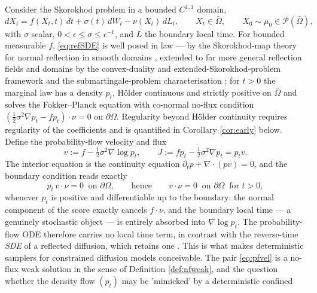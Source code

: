 \documentclass[11pt]{amsart}
\theoremstyle{definition}
\newcommand{\dive}{\nabla\!\cdot}
\newcommand{\PP}{\mathcal{P}}
\newcommand{\dd}{\,d}
\begin{document}
Consider the Skorokhod problem in a bounded $C^{1,1}$ domain,
\begin{equation}\label{eq:refSDE}
dX_t=f(X_t,t)\dd t+\sigma(t)\dd W_t-\nu(X_t)\dd L_t,\qquad
X_t\in\bar\Omega,\qquad X_0\sim\mu_0\in\PP(\bar\Omega),
\end{equation}
with $\sigma$ scalar, $0<\epsilon\le\sigma\le\epsilon^{-1}$, and $L$
the boundary local time. For bounded measurable $f$,
\eqref{eq:refSDE} is well posed in law --- by the Skorokhod-map
theory for normal reflection in smooth domains \cite{LionsSznitman},
extended to far more general reflection fields and domains by the
convex-duality and extended-Skorokhod-problem framework
\cite{DupuisRamanan,RamananESP} and the submartingale-problem
characterisation \cite{KangRamananSub}; 
for $t>0$ the marginal law
has a density $p_t$, H\"older continuous and strictly positive on
$\bar\Omega$ %
and solves the Fokker--Planck equation with co-normal
no-flux condition
$(\tfrac12\sigma^2\nabla p_t-fp_t)\cdot\nu=0$ on $\partial\Omega$.
Regularity beyond H\"older continuity requires regularity of the
coefficients and is quantified in Corollary \ref{cor:early} below.
Define the probability-flow velocity and flux
\begin{equation}\label{eq:pfvel}
v:=f-\tfrac12\sigma^2\nabla\log p_t,\qquad
J:=fp_t-\tfrac12\sigma^2\nabla p_t=p_tv .
\end{equation}
The interior equation is the continuity equation
$\partial_tp+\dive(pv)=0$, and the boundary condition reads exactly
\begin{equation}\label{eq:tangencyref}
p_t\,v\cdot\nu=0\ \text{ on }\partial\Omega,
\qquad\text{hence}\qquad
v\cdot\nu=0\ \text{ on }\partial\Omega\ \text{ for }t>0,
\end{equation}
whenever $p_t$ is positive and differentiable up to the boundary:
the normal component of
the score exactly cancels $f\cdot\nu$, and the boundary local time
--- a genuinely stochastic object --- is entirely absorbed into
$\nabla\log p_t$. The probability-flow ODE therefore carries no
local time term, in contrast with the reverse-time \emph{SDE} of a
reflected diffusion, which retains one \cite{Cattiaux88}. This is
what makes deterministic samplers for constrained diffusion models
\cite{LouErmon} conceivable. The pair \eqref{eq:pfvel} is a no-flux
weak solution in the sense of Definition \ref{def:nfweak}, and the
question whether the density flow $(p_t)$ may be 'mimicked' by   a deterministic confined
\end{document}

